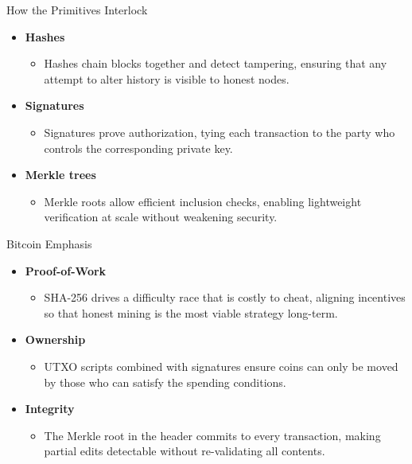 \documentclass[aspectratio=169]{beamer}
\begin{document}
\begin{frame}{How the Primitives Interlock}
  \begin{itemize}
    \item \textbf{Hashes}
      \begin{itemize}
        \item Hashes chain blocks together and detect tampering, ensuring that any attempt to alter history is visible to honest nodes.
      \end{itemize}
    \item \textbf{Signatures}
      \begin{itemize}
        \item Signatures prove authorization, tying each transaction to the party who controls the corresponding private key.
      \end{itemize}
    \item \textbf{Merkle trees}
      \begin{itemize}
        \item Merkle roots allow efficient inclusion checks, enabling lightweight verification at scale without weakening security.
      \end{itemize}
  \end{itemize}
\end{frame}

\begin{frame}{Bitcoin Emphasis}
  \begin{itemize}
    \item \textbf{Proof-of-Work}
      \begin{itemize}
        \item SHA-256 drives a difficulty race that is costly to cheat, aligning incentives so that honest mining is the most viable strategy long-term.
      \end{itemize}
    \item \textbf{Ownership}
      \begin{itemize}
        \item UTXO scripts combined with signatures ensure coins can only be moved by those who can satisfy the spending conditions.
      \end{itemize}
    \item \textbf{Integrity}
      \begin{itemize}
        \item The Merkle root in the header commits to every transaction, making partial edits detectable without re-validating all contents.
      \end{itemize}
  \end{itemize}
\end{frame}
\end{document}
